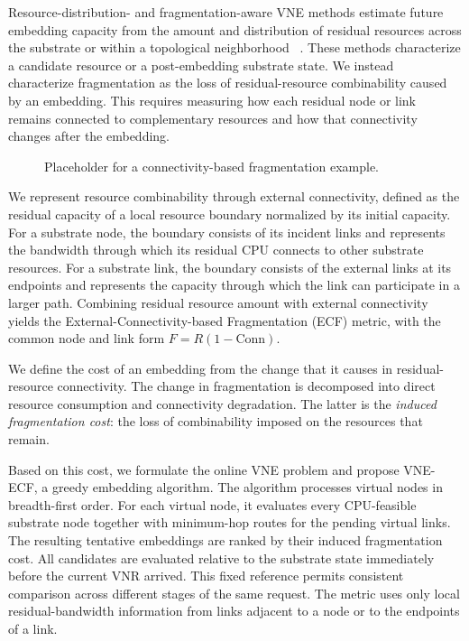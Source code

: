 \documentclass{ieeeaccess}
\newcommand{\ecf}{ECF}
\newcommand{\ecfvne}{VNE-ECF}
\begin{document}
Resource-distribution- and fragmentation-aware VNE methods estimate future embedding capacity from
the amount and distribution of residual resources across the substrate or within a topological neighborhood
~\cite{gong2014toward,lu2022resource}. These methods characterize a candidate resource or a
post-embedding substrate state. We instead characterize fragmentation as the loss of
residual-resource combinability caused by an embedding. This requires measuring how each residual
node or link remains connected to complementary resources and how that connectivity changes after
the embedding.

\begin{figure}[!t]
	\centering
	\caption{Placeholder for a connectivity-based fragmentation example.}
	\label{fig:combined_figures}
\end{figure}


We represent resource combinability through external connectivity, defined as the residual capacity
of a local resource boundary normalized by its initial capacity. For a substrate node, the boundary
consists of its incident links and represents the bandwidth through which its residual CPU connects
to other substrate resources. For a substrate link, the boundary consists of the external links at
its endpoints and represents the capacity through which the link can participate in a larger path.
Combining residual resource amount with external connectivity yields the
External-Connectivity-based Fragmentation (\ecf{}) metric, with the common node and link form
$F=R(1-\mathrm{Conn})$.

We define the cost of an embedding from the change that it causes in residual-resource
connectivity. The change in fragmentation is decomposed into direct resource consumption and
connectivity degradation. The latter is the \emph{induced fragmentation cost}: the loss of
combinability imposed on the resources that remain.

Based on this cost, we formulate the online VNE problem and propose \ecfvne{}, a greedy embedding
algorithm. The algorithm processes virtual nodes in breadth-first order. For each virtual node, it
evaluates every CPU-feasible substrate node together with minimum-hop routes for the pending virtual
links. The resulting tentative embeddings are ranked by their induced fragmentation cost. All
candidates are evaluated relative to the substrate state immediately before the current VNR
arrived. This fixed reference permits consistent comparison across different stages of the same
request. The metric uses only local residual-bandwidth information from links adjacent to a node or
to the endpoints of a link.
\end{document}
